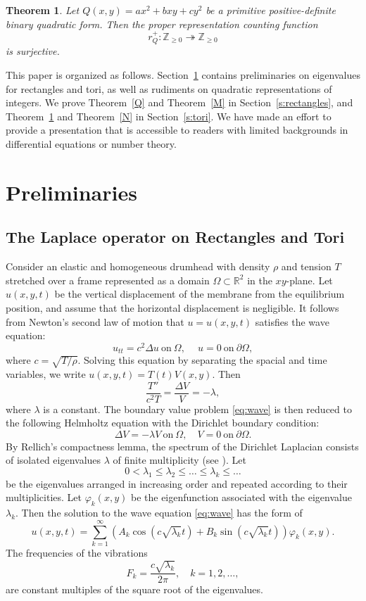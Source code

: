 \documentclass[11pt]{amsart}
\newtheorem{theorem}{Theorem}[section]
\theoremstyle{definition}
\def\R{{\mathbb R}}
\begin{document}
\begin{theorem}\label{Q2}
    Let $Q(x, y)=ax^2+bxy+cy^2$ be a primitive positive-definite binary quadratic form. Then the proper representation counting function \[r_Q^+:\mathbb{Z}_{\geq 0}\twoheadrightarrow \mathbb{Z}_{\geq 0}\] is surjective.
\end{theorem}

This paper is organized as follows. Section~\ref{s:prelim} contains preliminaries on eigenvalues for rectangles and tori, as well as rudiments on quadratic representations of integers. We prove Theorem~\ref{Q} and Theorem~\ref{M} in Section~\ref{s:rectangles}, and Theorem~\ref{Q2} and Theorem~\ref{N} in Section~\ref{s:tori}.  We have made an effort to provide a presentation that is accessible to readers with limited backgrounds in differential equations or number theory.

\section{Preliminaries}\label{s:prelim}
\subsection{The Laplace operator on Rectangles and Tori}\label{s:prelim:delta}

Consider an elastic and homogeneous drumhead with density $\rho$ and tension $T$ stretched over a
frame represented as a domain $\Omega\subset\R^2$ in the
$xy$-plane.  Let $u(x, y, t)$ be the vertical displacement of the
membrane from the equilibrium position, and assume that the
horizontal displacement is negligible. It follows from Newton's second law of motion that $u=u(x, y, t)$ satisfies the wave
equation:
\begin{equation}\label{eq:wave}
u_{tt}=c^2 \Delta u  \  \text{on}\ \Omega,  \quad \ u=0 \ \text{on}\ \partial\Omega, 
\end{equation}
where $c=\sqrt{T/\rho}$. Solving this equation by separating the spacial and time  variables, we write $u(x, y,
t)=T(t)V(x, y)$. Then   
\[
\frac{T''}{c^2 T}=\frac{\Delta V}{V}=-\lambda,
\]
where $\lambda$ is a constant. The boundary value problem \eqref{eq:wave} is then reduced to the following Helmholtz equation with the Dirichlet boundary condition:
\begin{equation}\label{eq:lap}
\Delta V=-\lambda V \ \text{on}\ \Omega,  \quad V=0 \ \text{on}\ \partial\Omega.
\end{equation}
By Rellich's compactness lemma, the spectrum of the Dirichlet Laplacian consists of isolated eigenvalues $\lambda$ of finite multiplicity (see \cite[Theorem 6.3.1]{Davies95}). Let
\[
0<\lambda_1 \le \lambda_2\le \ldots \le
\lambda_k\le \ldots
\]
be the eigenvalues arranged in increasing order and repeated
according to their multiplicities. Let
$\varphi_k(x, y)$ be the eigenfunction associated with the eigenvalue $\lambda_k$.
Then the solution to the wave equation \eqref{eq:wave} has the form of
$$
u(x, y, t)=\sum_{k=1}^\infty \left(A_k\cos(c\sqrt{\lambda_k}t)+B_k\sin(c\sqrt{\lambda_k}t)\right)\varphi_k(x, y).
$$
The frequencies of the vibrations
$$
F_k=\frac{c\sqrt{\lambda_k}}{2\pi}, \quad k=1, 2, \ldots, 
$$
are constant multiples of the square root of the eigenvalues. 
\end{document}
